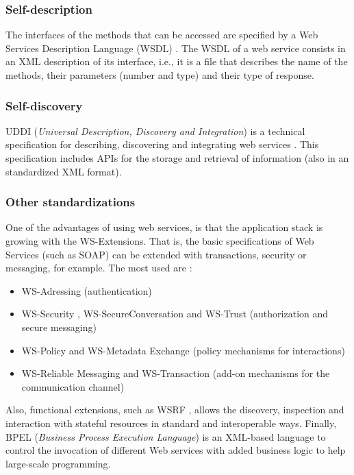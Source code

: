 \subsubsection{Self-description} The interfaces of the methods that can be accessed are specified by a Web Services Description Language (WSDL) \cite{WSDL}. The WSDL of a web service consists in an XML description of its interface, i.e., it is a file that describes the name of the methods, their parameters (number and type) and their type of response.

\subsubsection{Self-discovery} UDDI ({\em Universal Description, Discovery and Integration}) \cite{UDDI} is a technical specification for describing, discovering and integrating web services \cite{Cerami2002Webservices}. This specification includes APIs for the storage and retrieval of information (also in an standardized XML format).


\subsubsection{Other standardizations} One of the advantages of using web services, is that the application stack is growing with the WS-Extensions. That is, the basic specifications of Web Services (such as SOAP) can be extended with transactions, security or messaging, for example. The most used are \cite{Papazoglou2007SOA}:
\begin{itemize}
  \item WS-Adressing  (authentication)
  \item WS-Security , WS-SecureConversation  and WS-Trust  (authorization and secure messaging)
  \item WS-Policy and WS-Metadata Exchange (policy mechanisms for interactions)
  \item WS-Reliable Messaging  and WS-Transaction (add-on mechanisms for the communication channel)
\end{itemize}

Also, functional extensions, such as WSRF \cite{WSRF}, allows the discovery, inspection and interaction with stateful resources in standard and interoperable ways. Finally, BPEL ({\em Business Process Execution Language})  \cite{BPEL} is an XML-based language to control the invocation of different Web services with added business logic to help large-scale programming.

